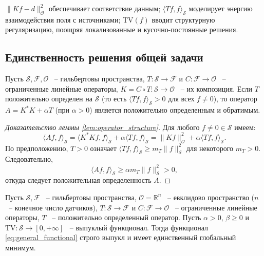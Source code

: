 \documentclass[a4paper,14pt,oneside,openany]{extarticle}
\begin{document}
$\|K f - d\|_{\mathcal{O}}^2$ обеспечивает соответствие данным;
$\langle T f, f\rangle_{\mathcal{S}}$ моделирует энергию взаимодействия поля с источниками;
$\mathrm{TV}(f)$ вводит структурную регуляризацию, поощряя локализованные и кусочно-постоянные решения.

\subsection{Единственность решения общей задачи}

\begin{lemma}\label{lem:operator_structure}
Пусть $\mathcal{S},\mathcal{F},\mathcal{O}$ ~-- гильбертовы пространства, $T:\mathcal{S}\to\mathcal{F}$
 и $C:\mathcal{F}\to\mathcal{O}$ ~-- ограниченные линейные операторы, $K=C\circ T:\mathcal{S}\to\mathcal{O}$
~-- их композиция. Если $T$ положительно определен на $\mathcal{S}$ 
(то есть $\langle Tf, f\rangle_{\mathcal{S}} > 0$ для всех $f \neq 0$), 
то оператор $A=K^*K+\alpha T$ (при $\alpha>0$) является положительно определенным и обратимым.
\end{lemma}

\begin{proof}[Доказательство леммы \ref{lem:operator_structure}]
Для любого $f \neq 0 \in \mathcal{S}$ имеем:
\begin{equation}
    \langle Af, f\rangle_{\mathcal{S}} = \langle K^*Kf, f\rangle_{\mathcal{S}} + 
    \alpha \langle Tf, f\rangle_{\mathcal{S}} = \|Kf\|_{\mathcal{O}}^2 + 
    \alpha \langle Tf, f\rangle_{\mathcal{S}}.
\end{equation}
По предположению, $T>0$ означает $\langle Tf, f\rangle_{\mathcal{S}} 
\geq m_T \|f\|_{\mathcal{S}}^2$ для некоторого $m_T > 0$. Следовательно,
\begin{equation}
    \langle Af, f\rangle_{\mathcal{S}} \geq \alpha m_T \|f\|_{\mathcal{S}}^2 > 0,
\end{equation}
откуда следует положительная определенность $A$.
\end{proof}

\begin{theorem}\label{th:general_uniqueness}
Пусть $\mathcal{S},\mathcal{F}$ ~-- гильбертовы пространства, $\mathcal{O} = \mathbb{R}^n$ ~-- 
евклидово пространство ($n$ ~-- конечное число датчиков), $T:\mathcal{S}\to\mathcal{F}$ и 
$C:\mathcal{F}\to\mathcal{O}$ ~-- ограниченные линейные операторы, 
$T$ ~-- положительно определенный оператор. 
Пусть $\alpha>0$, $\beta\ge0$ и $\mathrm{TV}:\mathcal{S}\to[0,+\infty]$ ~-- выпуклый
функционал. Тогда функционал \eqref{eq:general_functional} строго выпукл и имеет единственный 
глобальный минимум.
\end{theorem}
\end{document}

